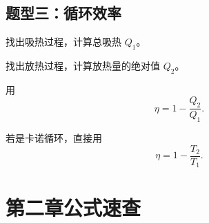 \subsection{题型三：循环效率}

\begin{MethodBox}[热机效率计算路线]
\begin{ReviewList}
  \item 找出吸热过程，计算总吸热 \(Q_1\)。
  \item 找出放热过程，计算放热量的绝对值 \(Q_2\)。
  \item 用
  \[
    \eta=1-\frac{Q_2}{Q_1}.
  \]
  \item 若是卡诺循环，直接用
  \[
    \eta=1-\frac{T_2}{T_1}.
  \]
\end{ReviewList}
\end{MethodBox}

\section{第二章公式速查}

